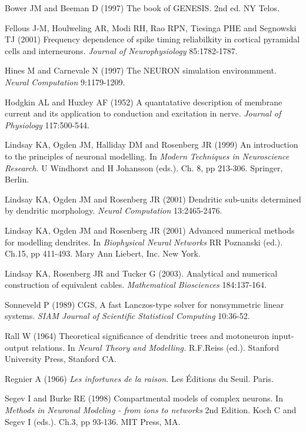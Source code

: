  

\begin{thebibliography}{99}
 Bower JM and Beeman D (1997) The
book of GENESIS. 2nd ed. NY Telos.

 Fellous J-M, Houlweling AR, Modi
RH, Rao RPN, Tiesinga PHE and Segnowski TJ (2001) Frequency
dependence of spike timing reliabilkity in cortical pyramidal
cells and interneurons. \emph{Journal of Neurophysiology}
85:1782-1787.

 Hines M and Carnevale N (1997) The
NEURON simulation environmment. \emph{Neural Computation}
9:1179-1209.

 Hodgkin AL and Huxley AF (1952) A
quantatative description of membrane current and its application
to conduction and excitation in nerve. \emph{Journal of
Physiology} 117:500-544.

 Lindsay KA, Ogden JM,
Halliday DM and Rosenberg JR (1999) An introduction to the
principles of neuronal modelling. In \emph{Modern Techniques in
Neuroscience Research.} U Windhorst and H Johansson (eds.). Ch. 8,
pp 213-306. Springer, Berlin.

 Lindsay KA, Ogden JM and
Rosenberg JR (2001) Dendritic sub-units determined by dendritic
morphology. \emph{Neural Computation} 13:2465-2476.

 Lindsay KA, Ogden JM and
Rosenberg JR (2001) Advanced numerical methods for modelling
dendrites. In \emph{Biophysical Neural Networks} RR Poznanski
(ed.). Ch.15, pp 411-493. Mary Ann Liebert, Inc. New York.

 Lindsay KA, Rosenberg JR and
Tucker G (2003). Analytical and numerical construction of
equivalent cables. \emph{Mathematical Biosciences} 184:137-164.

 Sonneveld P (1989) CGS, A fast
Lanczos-type solver for nonsymmetric linear systems. \emph{SIAM
Journal of Scientific Statistical Computing} 10:36-52.

 Rall W (1964) Theoretical significance
of dendritic trees and motoneuron input-output relations. In
\emph{Neural Theory and Modelling.} R.F.Reiss  (ed.). Stanford
University Press, Stanford CA.

 Regnier A (1966) \emph{Les infortunes
de la raison.} Les \'{E}ditions du Seuil. Paris.

 Segev I and Burke RE (1998)
Compartmental models of complex neurons. In \emph{Methods in
Neuronal Modeling - from ions to networks} 2nd Edition. Koch C and
Segev I (eds.). Ch.3, pp 93-136. MIT Press, MA.

\end{thebibliography}
